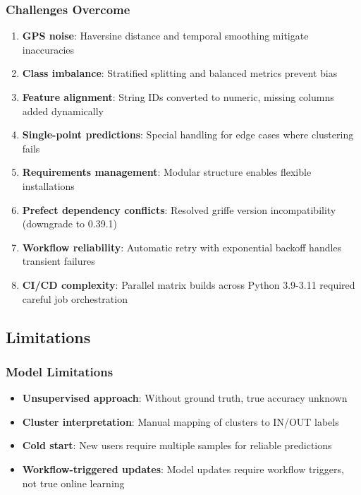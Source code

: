 \subsubsection{Challenges Overcome}

\begin{enumerate}
    \item \textbf{GPS noise}: Haversine distance and temporal smoothing mitigate inaccuracies
    \item \textbf{Class imbalance}: Stratified splitting and balanced metrics prevent bias
    \item \textbf{Feature alignment}: String IDs converted to numeric, missing columns added dynamically
    \item \textbf{Single-point predictions}: Special handling for edge cases where clustering fails
    \item \textbf{Requirements management}: Modular structure enables flexible installations
    \item \textbf{Prefect dependency conflicts}: Resolved griffe version incompatibility (downgrade to 0.39.1)
    \item \textbf{Workflow reliability}: Automatic retry with exponential backoff handles transient failures
    \item \textbf{CI/CD complexity}: Parallel matrix builds across Python 3.9-3.11 required careful job orchestration
\end{enumerate}

\subsection{Limitations}

\subsubsection{Model Limitations}

\begin{itemize}
    \item \textbf{Unsupervised approach}: Without ground truth, true accuracy unknown
    \item \textbf{Cluster interpretation}: Manual mapping of clusters to IN/OUT labels
    \item \textbf{Cold start}: New users require multiple samples for reliable predictions
    \item \textbf{Workflow-triggered updates}: Model updates require workflow triggers, not true online learning
\end{itemize}

